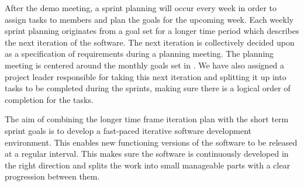     After the demo meeting, a sprint planning will occur every week in order to assign tasks to members and plan the goals for the upcoming week. Each weekly sprint planning originates from a goal set for a longer time period which describes the next iteration of the software. The next iteration is collectively decided upon as a specification of requirements during a planning meeting. The planning meeting is centered around the monthly goals set in . We have also assigned a project leader responsible for taking this next iteration and splitting it up into tasks to be completed during the sprints, making sure there is a logical order of completion for the tasks.

    The aim of combining the longer time frame iteration plan with the short term sprint goals is to develop a fast-paced iterative software development environment. This enables new functioning versions of the software to be released at a regular interval. This makes sure the software is continuously developed in the right direction and splits the work into small manageable parts with a clear progression between them.